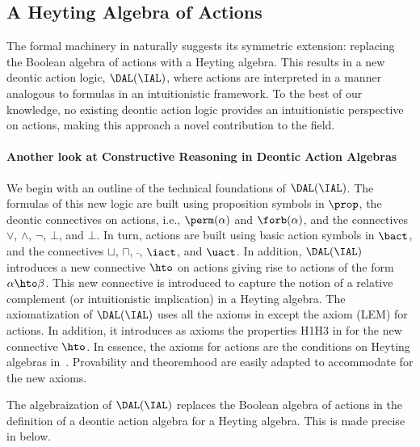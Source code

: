 \subsection{A Heyting Algebra of Actions}\label{sec:action-int}

The formal machinery in  naturally suggests its symmetric extension: replacing the Boolean algebra of actions with a Heyting algebra.
This results in a new deontic action logic, $\DAL(\IAL)$, where actions are interpreted in a manner analogous to formulas in an intuitionistic framework.
To the best of our knowledge, no existing deontic action logic provides an intuitionistic perspective on actions, making this approach a novel contribution to the field.

\paragraph{Another look at Constructive Reasoning in Deontic Action Algebras}

We begin with an outline of the technical foundations of $\DAL(\IAL)$.
The formulas of this new logic are built using proposition symbols in $\prop$, the deontic connectives on actions, i.e., $\perm(\alpha)$ and $\forb(\alpha)$, and the connectives $\lor$, $\land$, $\lnot$, $\bot$, and $\bot$.
In turn, actions are built using basic action symbols in $\bact$, and the connectives $\sqcup$, $\sqcap$, $\bar{~}$, $\iact$, and $\uact$.
In addition, $\DAL(\IAL)$ introduces a new connective $\hto$ on actions giving rise to actions of the form $\alpha \hto \beta$.
This new connective is introduced to capture the notion of a relative complement (or intuitionistic implication) in a Heyting algebra.
The axiomatization of $\DAL(\IAL)$ uses all the axioms in  except the axiom (LEM) for actions.
In addition, it introduces as axioms the properties H1\textendash H3 in  for the new connective $\hto$.
In essence, the axioms for actions are the conditions on Heyting algebras in~\cite{Esakia19}.
Provability and theoremhood are easily adapted to accommodate for the new axioms.

The algebraization of $\DAL(\IAL)$ replaces the Boolean algebra of actions in the definition of a deontic action algebra for a Heyting algebra. This is made precise in  below.

\medskip
{}
\medskip

